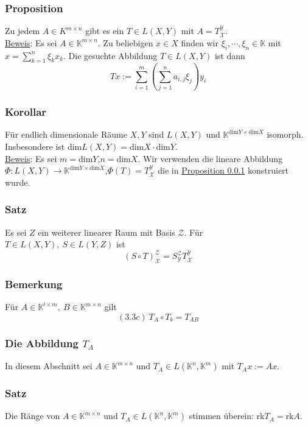 \subsubsection{Proposition}
\label{3.3.4}
Zu jedem $A\in K^{m\times n}$ gibt es ein $T\in L(X,Y)$ mit $A=T_\mathcal{X}^\mathcal{Y}$.\\
\underline{Beweis}: Es sei $A\in \mathbb{K}^{m\times n}$.  Zu beliebigen $x\in X$ finden wir $\xi _i,\cdots ,\xi _n\in\mathbb{K}$ mit $x=\sum_{k=1}^n \xi _kx_k$.  Die gesuchte Abbildung $T\in L(X,Y)$ ist dann
\[Tx:=\sum_{i=1}^m\left(\sum_{j=1}^na_{i,j}\xi _j\right)y_i\]
\subsubsection{Korollar}
Für endlich dimensionale Räume $X,Y$ sind $L(X,Y)$ und $\mathbb{K}^{\mathrm{dim}Y\times \mathrm{dim}X}$ isomorph.  Insbesondere ist dim$L(X,Y)=$dim$X\cdot$dim$Y$.\\
\underline{Beweis}: Es sei $m=$dim$Y$,$n=$dim$X$.  Wir verwenden die lineare Abbildung $\Phi :L(X,Y)\rightarrow \mathbb{K}^{\mathrm{dim}Y\times \mathrm{dim}X}$,$\Phi (T)=T_\mathcal{X}^\mathcal{Y}$ die in \hyperref[3.3.4]{Proposition \ref*{3.3.4}} konstruiert wurde.
\subsubsection{Satz}
Es sei $Z$ ein weiterer linearer Raum mit Basis $\mathcal{Z}$.  Für $T\in L(X,Y),\ S\in L(Y,Z)$ ist
\[ (S\circ T)_\mathcal{X}^\mathcal{Z}=S_\mathcal{Y}^\mathcal{Z}T_\mathcal{X}^\mathcal{Y}\]
\subsubsection{Bemerkung}
Für $A\in\mathbb{K}^{l\times m},\ B\in\mathbb{K}^{m\times n}$ gilt
\[(3.3c)\ T_A\circ T_b=T_{AB}\]
\addtocounter{subsubsection}{-6}
\subsubsection{Die Abbildung $T_A$}
\label{TA}
In diesem Abschnitt sei $A\in\mathbb{K}^{m\times n}$ und $T_A\in L(\mathbb{K}^n,\mathbb{K}^m)$ mit $T_Ax:=Ax$.
\addtocounter{subsubsection}{5}
\subsubsection{Satz}
\label{3.3.8}
Die Ränge von $A\in\mathbb{K}^{m\times n}$ und $T_A\in L(\mathbb{K}^n,\mathbb{K}^m)$ stimmen überein: rk$T_A=$rk$A$.
